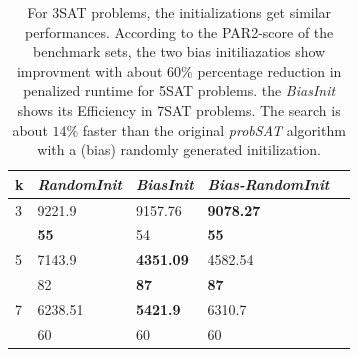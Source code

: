 \documentclass[12pt,a4paper,twoside]{scrartcl}
\numberwithin{equation}{section}
\begin{document}
\begin{table}[H]
\label{tab:com}
\begin{center}
    \begin{tabular}{|l|l|l|l|p{1cm}|}
\hline 
    k &\emph{RandomInit}&\emph{BiasInit}&\emph{Bias-RandomInit} \\ \hline
	3&9221.9 &9157.76 &\textbf{9078.27} \\ 
	&\textbf{55} &54 & \textbf{55} \\ \hline
	5&7143.9&\textbf{4351.09}&4582.54\\ 
	&82 &\textbf{87} &\textbf{87}\\ \hline
	7&6238.51&\textbf{5421.9}& 6310.7\\
	&60 & 60 & 60 \\ \hline
	
\end{tabular}
\caption{For 3SAT problems, the initializations get similar performances. According to the PAR2-score of the benchmark sets, the two bias initiliazatios show improvment with about $60\%$ percentage reduction in penalized runtime for 5SAT problems.  the \emph{BiasInit} shows its Efficiency in 7SAT problems. The search is about $14\%$ faster than the original \emph{probSAT} algorithm with a (bias) randomly generated initilization. }
\end{center}
\end{table} 
\clearpage
\end{document}
